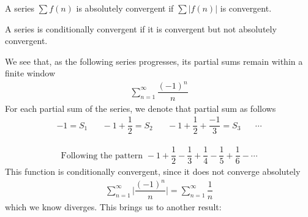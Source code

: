 \begin{definition}
A series $\sum f(n)$ is absolutely convergent if $\sum \lvert f(n) \rvert$ is convergent. 
\end{definition}

\begin{definition}
A series is conditionally convergent if it is convergent but not absolutely convergent.
\end{definition}

\begin{example}
We see that, as the following series progresses, its partial sums remain within a finite window
\begin{align*}
    \sum_{n = 1}^{\infty} \dfrac{(-1)^{n}}{n}
\end{align*}
For each partial sum of the series, we denote that partial sum as follows
\begin{align*}
    -1 = S_{1} \hspace{20pt} -1 + \dfrac{1}{2} = S_{2} \hspace{20pt} -1 + \dfrac{1}{2} + \dfrac{-1}{3} = S_{3} \hspace{20pt} \cdots
\end{align*}
\begin{align*}
    \text{Following the pattern} \hspace{4pt} -1 + \dfrac{1}{2} - \dfrac{1}{3} + \dfrac{1}{4} - \dfrac{1}{5} + \dfrac{1}{6} - \cdots
\end{align*}
This function is conditionally convergent, since it does not converge absolutely
\begin{align*}
    \sum_{n=1}^{\infty} \Big\lvert \dfrac{(-1)^{n}}{n} \Big\rvert = \sum_{n=1}^{\infty} \dfrac{1}{n}
\end{align*}
which we know diverges. This brings us to another result:
\end{example}

